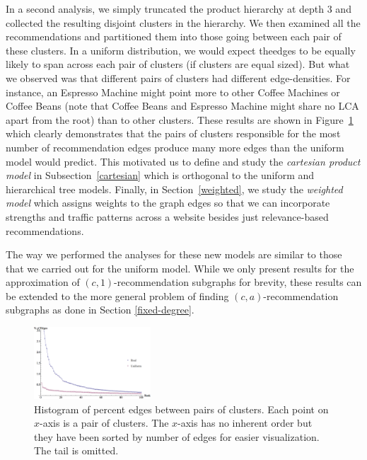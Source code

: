  In a second analysis, we simply truncated the product hierarchy
at depth 3 and collected the resulting disjoint clusters in the
hierarchy. We then examined all the recommendations and partitioned
them into those going between each pair of these clusters. In a
uniform distribution, we would expect theedges to be equally likely
to span across each pair of clusters (if clusters are equal
sized). But what we observed was that different pairs of clusters
had different edge-densities. For instance, an Espresso Machine might
point more to other Coffee Machines or Coffee Beans (note that
Coffee Beans and Espresso Machine might share no LCA apart from the
root) than to other clusters. These results are shown in
Figure~\ref{fig:cart-emp} which clearly demonstrates that the pairs of
clusters responsible for the most number of recommendation edges
produce many more edges than the uniform model would predict.  This
motivated us to define and study the {\em cartesian product model} in
Subsection~\ref{cartesian} which is orthogonal to the uniform and
hierarchical tree models. Finally, in Section~\ref{weighted}, we study
the {\em weighted model}
 which assigns weights to the graph edges so
that we can incorporate strengths and traffic
 patterns across a
website besides just relevance-based recommendations.

The way we performed the analyses for these new models are similar to those 
that we carried out for the uniform model. While we only present
results for the approximation of $(c,1)$-recommendation subgraphs for brevity, 
these results can be extended to the more general problem of finding
$(c,a)$-recommendation subgraphs as done in Section \ref{fixed-degree}.

\begin{figure}
\centering
\includegraphics[width=0.39\textwidth]{images/cartesian_histogram.png}
\caption{Histogram of percent edges between pairs of clusters. Each
  point on $x$-axis is a pair of clusters. The $x$-axis has no
  inherent order but they have been sorted by number of edges for easier
  visualization. The tail is omitted.}
\label{fig:cart-emp}
\end{figure}

